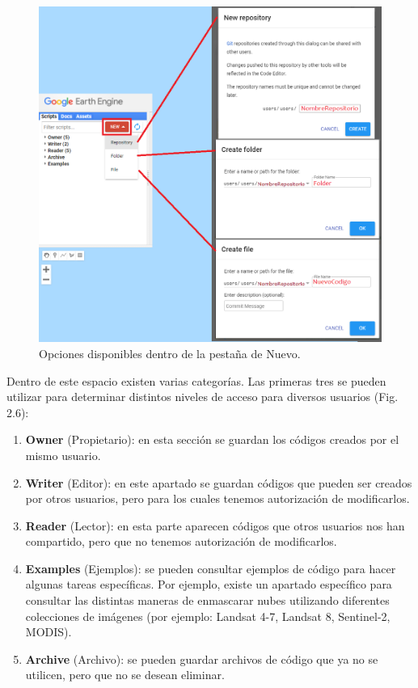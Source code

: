 \documentclass[
  12pt,
  letterpaper,
  twoside]{book}
\providecommand{\tightlist}{%
  \setlength{\itemsep}{0pt}\setlength{\parskip}{0pt}}
\begin{document}
\begin{figure}[btp]

{\centering \includegraphics[width=0.8\linewidth]{Img/repofolderfile} 

}

\caption{Opciones disponibles dentro de la pestaña de Nuevo.}\label{fig:unnamed-chunk-6}
\end{figure}

Dentro de este espacio existen varias categorías. Las primeras tres se pueden utilizar para determinar distintos niveles de acceso para diversos usuarios (Fig. 2.6):

\begin{enumerate}
\def\labelenumi{\arabic{enumi}.}
\tightlist
\item
  \textbf{Owner} (Propietario): en esta sección se guardan los códigos creados por el mismo usuario.
\item
  \textbf{Writer} (Editor): en este apartado se guardan códigos que pueden ser creados por otros usuarios, pero para los cuales tenemos autorización de modificarlos.
\item
  \textbf{Reader} (Lector): en esta parte aparecen códigos que otros usuarios nos han compartido, pero que no tenemos autorización de modificarlos.
\item
  \textbf{Examples} (Ejemplos): se pueden consultar ejemplos de código para hacer algunas tareas específicas. Por ejemplo, existe un apartado específico para consultar las distintas maneras de enmascarar nubes utilizando diferentes colecciones de imágenes (por ejemplo: Landsat 4-7, Landsat 8, Sentinel-2, MODIS).
\item
  \textbf{Archive} (Archivo): se pueden guardar archivos de código que ya no se utilicen, pero que no se desean eliminar.
\end{enumerate}
\end{document}

